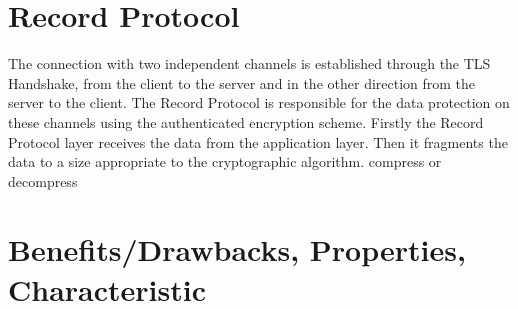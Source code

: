 \section{Record Protocol}
\label{sec:record_protocol}

The connection with two independent channels is established through the TLS Handshake, from the client to the server and in the other direction from the server to the client. The Record Protocol is responsible for the data protection on these channels using the authenticated encryption scheme.
Firstly the Record Protocol layer receives the data from the application layer. Then it fragments the data to a size appropriate to the cryptographic algorithm. compress or decompress 


\section{Benefits/Drawbacks, Properties, Characteristic}
\label{sec:introduction_suggestions}



